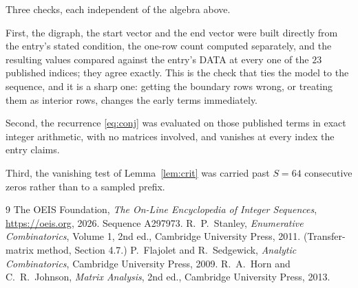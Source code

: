 \documentclass[11pt,a4paper]{article}
\theoremstyle{plain}
\theoremstyle{definition}
\begin{document}
Three checks, each independent of the algebra above.

First, the digraph, the start vector and the end vector were built directly from the
entry's stated condition, the one-row count computed separately, and the resulting values
compared against the entry's DATA at every one of the $23$ published indices; they
agree exactly. This is the check that ties the model to the sequence, and it is a sharp one:
getting the boundary rows wrong, or treating them as interior rows, changes the early terms
immediately.

Second, the recurrence \eqref{eq:conj} was evaluated on those published terms in exact
integer arithmetic, with no matrices involved, and vanishes at every index the entry claims.

Third, the vanishing test of Lemma~\ref{lem:crit} was carried past $S=64$ consecutive
zeros rather than to a sampled prefix.

\begin{thebibliography}{9}
 The OEIS Foundation, \emph{The On-Line Encyclopedia of Integer
Sequences}, \url{https://oeis.org}, 2026. Sequence A297973.
 R.~P.~Stanley, \emph{Enumerative Combinatorics}, Volume 1, 2nd ed.,
Cambridge University Press, 2011. (Transfer-matrix method, Section 4.7.)
 P.~Flajolet and R.~Sedgewick, \emph{Analytic Combinatorics}, Cambridge
University Press, 2009.
 R.~A.~Horn and C.~R.~Johnson, \emph{Matrix Analysis}, 2nd ed., Cambridge
University Press, 2013.
\end{thebibliography}
\end{document}
